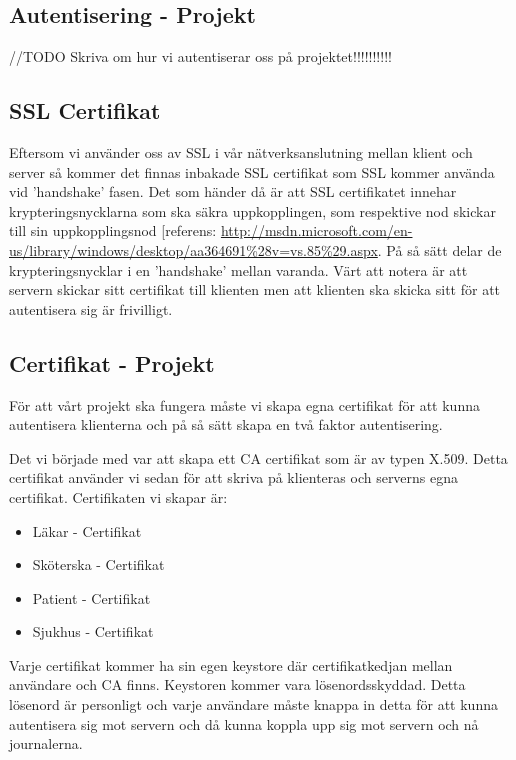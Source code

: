 \subsection{Autentisering - Projekt}

//TODO Skriva om hur vi autentiserar oss på projektet!!!!!!!!!!                                           

\subsection{SSL Certifikat}
Eftersom vi använder oss av SSL i vår nätverksanslutning mellan klient och server så kommer det finnas inbakade SSL certifikat som SSL kommer använda vid 'handshake' fasen. Det som händer då är att SSL certifikatet innehar krypteringsnycklarna som ska säkra uppkopplingen, som respektive nod skickar till sin uppkopplingsnod [referens: \url{http://msdn.microsoft.com/en-us/library/windows/desktop/aa364691%28v=vs.85%29.aspx}. På så sätt delar de krypteringsnycklar i en 'handshake' mellan varanda. Värt att notera är att servern skickar sitt certifikat till klienten men att klienten ska skicka sitt för att autentisera sig är frivilligt.

\subsection{Certifikat - Projekt}
För att vårt projekt ska fungera måste vi skapa egna certifikat för att kunna autentisera klienterna och på så sätt skapa en två faktor autentisering. 

Det vi började med var att skapa ett CA certifikat som är av typen X.509. Detta certifikat använder vi sedan för att skriva på klienteras och serverns egna certifikat. Certifikaten vi skapar är:

\begin{itemize}
\item{Läkar - Certifikat}
\item{Sköterska - Certifikat}
\item{Patient - Certifikat}
\item{Sjukhus - Certifikat}
\end{itemize}

Varje certifikat kommer ha sin egen keystore där certifikatkedjan mellan användare och CA finns. Keystoren kommer vara lösenordsskyddad. Detta lösenord är personligt och varje användare måste knappa in detta för att kunna autentisera sig mot servern och då kunna koppla upp sig mot servern och nå journalerna. 